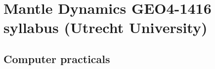 \chapter{Mantle Dynamics GEO4-1416 syllabus (Utrecht University) \label{chapt:md}} 



\newpage

\section{Computer practicals} 
